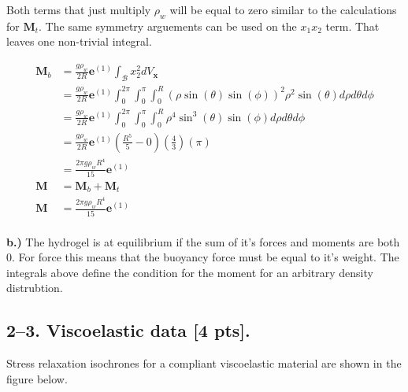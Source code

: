 Both terms that just multiply $\rho_w$ will be equal to zero similar to the calculations for $\mathbf{M}_t$. The same symmetry arguements can be used on the $x_1x_2$ term. That leaves one non-trivial integral. 

\begin{align*}
    \mathbf{M}_b &= \frac{g\rho_w}{2R} \mathbf{e}^{(1)} \int_\mathcal{B}x_2^2 dV_\mathbf{x} \\
    &= \frac{g\rho_w}{2R} \mathbf{e}^{(1)} \int_0^{2\pi}\int_0^\pi\int_0^R (\rho\sin(\theta)\sin(\phi))^2\rho^2\sin(\theta)d\rho d\theta d\phi \\
    &= \frac{g\rho_w}{2R} \mathbf{e}^{(1)} \int_0^{2\pi}\int_0^\pi\int_0^R \rho^4\sin^3(\theta)\sin(\phi)d\rho d\theta d\phi \\
    &= \frac{g\rho_w}{2R} \mathbf{e}^{(1)}\left(\frac{R^5}{5}-0\right)\left(\frac{4}{3}\right)(\pi) \\
    &= \frac{2\pi g\rho_wR^4}{15} \mathbf{e}^{(1)} \\
    \mathbf{M} &= \mathbf{M}_b + \mathbf{M}_t \\
    \mathbf{M} &= \frac{2\pi g\rho_wR^4}{15} \mathbf{e}^{(1)} \\
\end{align*}

\textbf{b.)} The hydrogel is at equilibrium if the sum of it's forces and moments are both 0. For force this means that the buoyancy force must be equal to it's weight. The integrals above define the condition for the moment for an arbitrary density distrubtion. 


\bigskip
\subsection*{2--3. \textbf{Viscoelastic data} [4 pts].} 
Stress relaxation isochrones for a compliant viscoelastic material are shown in the figure below.  

